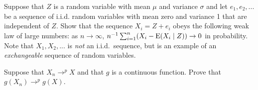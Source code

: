 \begin{hw}
  Suppose that $Z$ is a random variable with mean $\mu$ and variance
  $\sigma$ and let $e_1,e_2,...$ be a sequence of i.i.d. random
  variables with mean zero and variance 1 that are independent of $Z$.
  Show that the sequence $X_i = Z + e_i$ obeys the following weak law
  of large numbers: as $n \to \infty$, $n^{-1} \sum_{i=1}^n ( X_i -
  \operatorname{E}(X_i \mid Z) ) \to 0$ in probability. Note that $X_1,X_2,...$ is
  \emph{not} an i.i.d.\ sequence, but is an example of an
  \emph{exchangeable} sequence of random variables.
\end{hw}

\begin{hw}
  Suppose that $X_n \to^p X$ and that $g$ is a continuous function.
  Prove that $g(X_n) \to^p g(X)$.
\end{hw}

